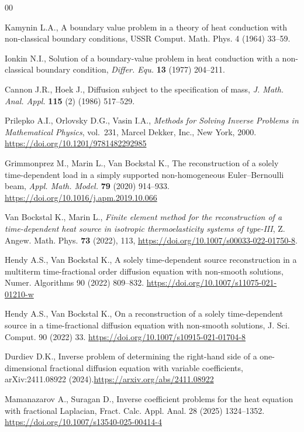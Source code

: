 \documentclass[reqno]{amsart}
\begin{document}
\begin{thebibliography}{00}

Kamynin L.A., A boundary value problem in a theory of heat conduction with non-classical boundary conditions, USSR Comput. Math. Phys. 4 (1964) 33–59.

Ionkin N.I., Solution of a boundary-value problem in heat conduction with a non-classical boundary condition, \textit{Differ. Equ.} \textbf{13} (1977) 204--211.

Cannon J.R., Hoek J., Diffusion subject to the specification of mass, \textit{J. Math. Anal. Appl.} \textbf{115} (2) (1986) 517--529.

Prilepko A.I., Orlovsky D.G., Vasin I.A., \textit{Methods for Solving Inverse Problems in Mathematical Physics}, 
vol.~231, Marcel Dekker, Inc., New York, 2000.
\url{https://doi.org/10.1201/9781482292985}

Grimmonprez M., Marin L., Van Bockstal K., The reconstruction of a solely time-dependent load in a simply supported non-homogeneous Euler–Bernoulli beam, \textit{Appl. Math. Model.} \textbf{79} (2020) 914--933. \url{https://doi.org/10.1016/j.apm.2019.10.066}

Van Bockstal K., Marin L., \textit{Finite element method for the reconstruction of a time-dependent heat source in isotropic thermoelasticity systems of type-III},  
Z. Angew. Math. Phys. \textbf{73} (2022), 113, \url{https://doi.org/10.1007/s00033-022-01750-8}.

Hendy A.S., Van Bockstal K., A solely time-dependent source reconstruction in a multiterm time-fractional order diffusion equation with non-smooth solutions, Numer. Algorithms 90 (2022) 809–832. \url{https://doi.org/10.1007/s11075-021-01210-w}

Hendy A.S., Van Bockstal K., On a reconstruction of a solely time-dependent source in a time-fractional diffusion equation with non-smooth solutions, J. Sci. Comput. 90 (2022) 33. \url{https://doi.org/10.1007/s10915-021-01704-8}

Durdiev D.K., Inverse problem of determining the right-hand side of a one-dimensional fractional diffusion equation with variable coefficients, arXiv:2411.08922 (2024).\url{https://arxiv.org/abs/2411.08922}

Mamanazarov A., Suragan D., Inverse coefficient problems for the heat equation with fractional Laplacian, Fract. Calc. Appl. Anal. 28 (2025) 1324–1352. \url{ https://doi.org/10.1007/s13540-025-00414-4}


\end{thebibliography}
\end{document}
